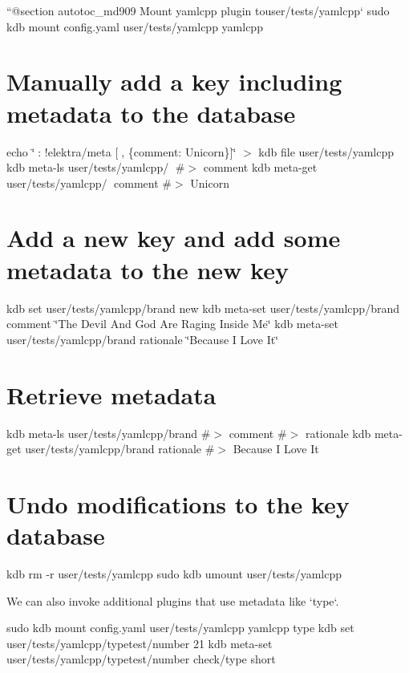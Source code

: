 ``{\ttfamily  @section autotoc\+\_\+md909 Mount yamlcpp plugin to}user/tests/yamlcpp` sudo kdb mount config.\+yaml user/tests/yamlcpp yamlcpp\hypertarget{autotoc_md865_autotoc_md910}{}\section{Manually add a key including metadata to the database}\label{autotoc_md865_autotoc_md910}
echo \char`\"{}🔑\+: !elektra/meta \mbox{[}🦄, \{comment\+: Unicorn\}\mbox{]}\char`\"{} $>$ {\ttfamily kdb file user/tests/yamlcpp} kdb meta-\/ls user/tests/yamlcpp/🔑 \#$>$ comment kdb meta-\/get user/tests/yamlcpp/🔑 comment \#$>$ Unicorn\hypertarget{autotoc_md865_autotoc_md911}{}\section{Add a new key and add some metadata to the new key}\label{autotoc_md865_autotoc_md911}
kdb set user/tests/yamlcpp/brand new kdb meta-\/set user/tests/yamlcpp/brand comment \char`\"{}\+The Devil And God Are Raging Inside Me\char`\"{} kdb meta-\/set user/tests/yamlcpp/brand rationale \char`\"{}\+Because I Love It\char`\"{}\hypertarget{autotoc_md865_autotoc_md912}{}\section{Retrieve metadata}\label{autotoc_md865_autotoc_md912}
kdb meta-\/ls user/tests/yamlcpp/brand \#$>$ comment \#$>$ rationale kdb meta-\/get user/tests/yamlcpp/brand rationale \#$>$ Because I Love It\hypertarget{autotoc_md865_autotoc_md913}{}\section{Undo modifications to the key database}\label{autotoc_md865_autotoc_md913}
kdb rm -\/r user/tests/yamlcpp sudo kdb umount user/tests/yamlcpp 
\begin{DoxyCode}
We can also invoke additional plugins that use metadata like `type`.
\end{DoxyCode}
 sudo kdb mount config.\+yaml user/tests/yamlcpp yamlcpp type kdb set user/tests/yamlcpp/typetest/number 21 kdb meta-\/set user/tests/yamlcpp/typetest/number check/type short

